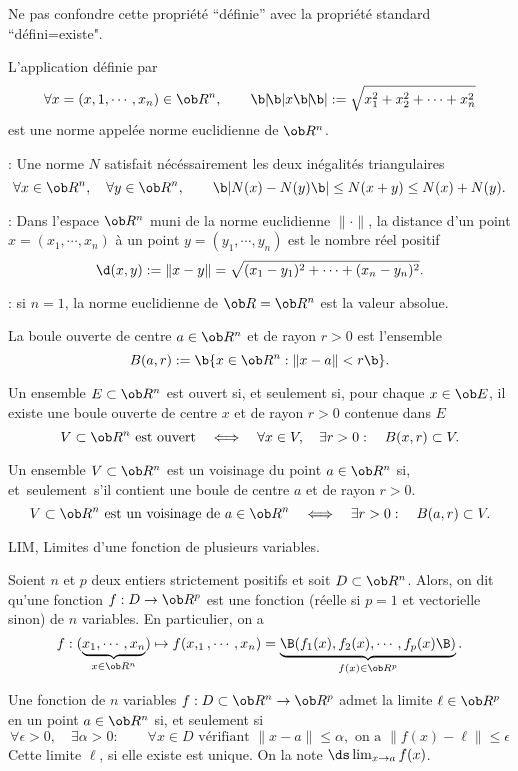  Ne pas confondre cette propri\'et\'e ``d\'efinie'' avec la propri\'et\'e standard ``d\'efini=existe". 
\medskip 


\Propriete []  L'application d\'efinie par 
$$
\forall x=(x,1,\cdots, x_n)\in\ob R^n, \qquad \b|\!\b|x\b|\!\b|:=\sqrt{x_1^2+x_2^2+\cdots+x_n^2}
$$
est une norme appel\'ee norme euclidienne de $\ob R^n$. 
\bigskip


\Remarque :  Une norme $N$ satisfait n\'ec\'essairement les deux in\'egalit\'es triangulaires 
$$
\forall x\in\ob R^n , \quad  \forall y\in\ob R^n , \qquad\b|N(x)-N(y)\b|\le N(x+y)\le N(x)+N(y).
$$


\Remarque :  Dans l'espace $\ob R^n$ muni de la norme euclidienne $\|\cdot\|$, la distance d'un point $x=(x_1,\cdots,x_n)$ \`a un point $y=(y_1,\cdots,y_n)$ 
est le nombre r\'eel positif 
$$
\d(x,y):=\|x-y\|=\sqrt{(x_1-y_1)^2+\cdots+(x_n-y_n)^2}.
$$


\Remarque :  si $n=1$, la norme euclidienne de $\ob R=\ob R^n$ est la valeur absolue. 
\bigskip



\Definition []  La boule ouverte de centre $a\in\ob R^n$ et de rayon $r>0$ est l'ensemble 
$$
{
\sc B(a,r):=\b\{x\in\ob R^n:\|x-a\|<r\b\}}.
$$


\Definition []  Un ensemble $E\subset\ob R^n$ est ouvert si, et seulement si, pour chaque $x\in\ob E$, il existe une boule ouverte de centre $x$ et de rayon $r>0$ contenue dans $E$
$$
V\subset\ob R^n\mbox{ est ouvert}\quad\Longleftrightarrow\quad\forall x\in V, \quad \exists r>0:\quad \sc B(x,r)\subset V.
$$


\Definition []  Un ensemble $V\subset\ob R^n$ est un voisinage du point $a\in\ob R^n$ si, et~seulement~s'il contient une boule de centre $a$ et de rayon $r>0$. 
$$
V\subset\ob R^n\mbox{ est un voisinage de }a\in\ob R^n\quad\Longleftrightarrow\quad\exists r>0:\quad \sc B(a,r)\subset V.
$$


\Subsection LIM, Limites d'une fonction de plusieurs variables. 


\Definition []  Soient $n$ et $p$ deux entiers strictement positifs et soit $D\subset\ob R^n$. Alors, on dit qu'une fonction 
$f:D\to\ob R^p$ est une fonction (r\'eelle si $p=1$ et vectorielle sinon) de $n$ variables. En particulier, on a 
$$
f:(\underbrace{x_1,\cdots, x_n}_{x\in\ob R^n})\mapsto f(x,_1,\cdots, x_n)=\underbrace{\B(f_1(x),f_2(x),\cdots,f_p(x)\B)}_{f(x)\in\ob R^p}.
$$ 
\bigskip


\Definition []  Une fonction de $n$ variables $f:D\subset\ob R^n\to \ob R^p$ admet la limite $\ell\in\ob R^p$ en un point $a\in\ob R^n$ si, et seulement si 
$$
\forall \epsilon> 0, \quad \exists \alpha>0:\qquad \forall x\in D\mbox{ v\'erifiant } \|x-a\|\le \alpha, \mbox{ on a }\|f(x)-\ell\|\le\epsilon 
$$
Cette limite $\ell$, si elle existe est unique. On la note $\ds\lim_{x\to a}f(x)$. 
\bigskip

